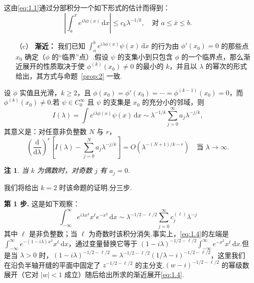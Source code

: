 \documentclass[
  BookTitleCN={傅里叶分析中的振动积分},
  BookTitleEN={Oscillatory Integrals in Fourier Analysis},
  OriginalAuthor={E.~M. Stein},
  OriginalEdition={Proc. Sympos. Pure Math. 35, Part~1},
  OriginalPublisher={American Mathematical Society},
  OriginalYear={1979},
  Translator={翻译及重排},
  ModelUsed={Codex CLI},
  Biblatex=false,
  TranslationDate={2026年8月27日}
]{mathtranslation}
\numberwithin{equation}{chapter}   %
\newtheorem*{remark*}{注}
\begin{document}
\noindent 这由\eqref{eq:1.1}通过分部积分一个如下形式的估计而得到：
\[
  \left|\int_{a}^{\bar{x}}e^{i\lambda\phi(x)}\,\mathrm{d}x\right|\leq c_{k}\lambda^{-1/k},\quad\text{对 }a\leq\bar{x}\leq b .
\]

\begin{enumerate}
  \item[（c）] \textbf{渐近：} 我们已知 $\int_{a}^{b}e^{i\lambda\phi(x)}\psi(x)\,\mathrm{d}x$ 的行为由 $\phi'(x_0)=0$ 的那些点 $x_0$ 确定（$\phi$ 的``临界''点）.假设 $\psi$ 的支集小到只包含 $\phi$ 的一个临界点，那么渐近展开的性质取决于使 $\phi^{(k)}(x_0)\neq0$ 的最小的 $k$，并且以 $\lambda$ 的幂次的形式给出，其方式与命题~\ref{prop:2} 一致.
\end{enumerate}

\begin{proposition}\label{prop:3}
  设 $\phi$ 实值且光滑，$k\geq2$，且 $\phi(x_0)=\phi'(x_0)=\cdots=\phi^{(k-1)}(x_0)=0$，而 $\phi^{(k)}(x_0)\neq0$.若 $\psi\in C_0^\infty$ 且 $\psi$ 的支集是 $x_0$ 的充分小的邻域，则
  \begin{equation}
    I(\lambda)=\int e^{i\lambda\phi(x)}\psi(x)\,\mathrm{d}x \sim \lambda^{-1/k}\sum_{j=0}^{\infty}a_{j}\lambda^{-j/k}, \label{eq:1.3}
  \end{equation}
  其意义是：对任意非负整数 $N$ 与 $r$，
  \begin{equation}
    \left(\frac{\mathrm{d}}{\mathrm{d}\lambda}\right)^{r}\left[I(\lambda)-\sum_{j=0}^{N}a_{j}\lambda^{-j/k}\right]=O(\lambda^{-(N+1)/k-r})\quad\text{当 }\lambda\to\infty . \tag{$1.3'$}\label{eq:1.3prime}
  \end{equation}
\end{proposition}

\begin{remark*}
  当 $k$ 为偶数时，对奇数 $j$ 有 $a_{j}=0$.
\end{remark*}

\noindent 我们将给出 $k=2$ 时该命题的证明.分三步.

\textbf{第 1 步.} 这是如下观察：
\begin{equation}\label{eq:1.4}
  \int_{-\infty}^{\infty}e^{i\lambda x^{2}}x^{\ell}e^{-x^{2}}\,\mathrm{d}x \sim \lambda^{-1/2-\ell/2}\sum_{j=0}^{\infty}c_{j}^{(\ell)}\lambda^{-j}
\end{equation}
其中 $\ell$ 是非负整数；当 $\ell$ 为奇数时该积分消失.事实上，\eqref{eq:1.4}的左端是 $\int_{-\infty}^{\infty}e^{-(1-i\lambda)x^{2}}x^{\ell}\,\mathrm{d}x$，通过变量替换它等于 $(1-i\lambda)^{-1/2-\ell/2}\int_{-\infty}^{\infty}e^{-x^{2}}x^{\ell}\,\mathrm{d}x$.但是当 $\lambda>0$ 时，$(1-i\lambda)^{-1/2-\ell/2}=\lambda^{-1/2-\ell/2}(1/\lambda-i)^{-1/2-\ell/2}$，这里我们在沿负半轴开缝的平面中固定了 $z^{-1/2-\ell/2}$ 的主分支.$(w-i)^{-1/2-\ell/2}$ 的幂级数展开（它对 $|w|<1$ 成立）随后给出所求的渐近展开\eqref{eq:1.4}.
\end{document}
